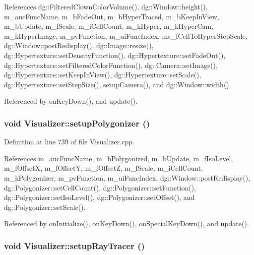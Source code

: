 References dg::Filtered\-Clown\-Color\-Volume(), dg::Window::height(), m\_\-auc\-Func\-Name, m\_\-b\-Fade\-Out, m\_\-b\-Hyper\-Traced, m\_\-b\-Keep\-In\-View, m\_\-b\-Update, m\_\-f\-Scale, m\_\-i\-Cell\-Count, m\_\-k\-Hyper, m\_\-k\-Hyper\-Cam, m\_\-k\-Hyper\-Image, m\_\-pv\-Function, m\_\-ui\-Func\-Index, ms\_\-f\-Cell\-To\-Hyper\-Step\-Scale, dg::Window::post\-Redisplay(), dg::Image::resize(), dg::Hypertexture::set\-Density\-Function(), dg::Hypertexture::set\-Fade\-Out(), dg::Hypertexture::set\-Filtered\-Color\-Function(), dg::Camera::set\-Image(), dg::Hypertexture::set\-Keep\-In\-View(), dg::Hypertexture::set\-Scale(), dg::Hypertexture::set\-Step\-Size(), setup\-Camera(), and dg::Window::width().

Referenced by on\-Key\-Down(), and update().
\subsubsection{\setlength{\rightskip}{0pt plus 5cm}void Visualizer::setup\-Polygonizer ()\hspace{0.3cm}{\tt  [protected]}}\label{classdg_1_1Visualizer_b0}




Definition at line 739 of file Visualizer.cpp.

References m\_\-auc\-Func\-Name, m\_\-b\-Polygonized, m\_\-b\-Update, m\_\-f\-Iso\-Level, m\_\-f\-Offset\-X, m\_\-f\-Offset\-Y, m\_\-f\-Offset\-Z, m\_\-f\-Scale, m\_\-i\-Cell\-Count, m\_\-k\-Polygonizer, m\_\-pv\-Function, m\_\-ui\-Func\-Index, dg::Window::post\-Redisplay(), dg::Polygonizer::set\-Cell\-Count(), dg::Polygonizer::set\-Function(), dg::Polygonizer::set\-Iso\-Level(), dg::Polygonizer::set\-Offset(), and dg::Polygonizer::set\-Scale().

Referenced by on\-Initialize(), on\-Key\-Down(), on\-Special\-Key\-Down(), and update().
\subsubsection{\setlength{\rightskip}{0pt plus 5cm}void Visualizer::setup\-Ray\-Tracer ()\hspace{0.3cm}{\tt  [protected]}}\label{classdg_1_1Visualizer_b1}




